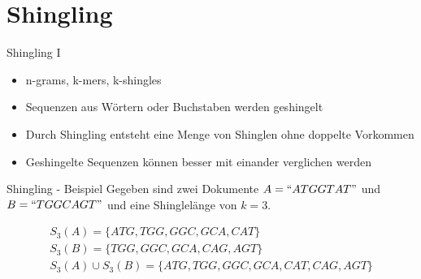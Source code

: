 \section{Shingling}

\begin{frame}{Shingling I}
    \begin{itemize}
        \item n-grams, k-mers, k-shingles
        \item Sequenzen aus Wörtern oder Buchstaben werden geshingelt
        \item Durch Shingling entsteht eine Menge von Shinglen ohne doppelte Vorkommen
        \item Geshingelte Sequenzen können besser mit einander verglichen werden
    \end{itemize}
\end{frame}


\begin{frame}{Shingling - Beispiel}
    Gegeben sind zwei Dokumente $ A = ``ATGGTAT" $ und $ B = ``TGGCAGT" $ und eine Shinglelänge von $ k = 3 $.
    
    \begin{example}
        \begin{equation*}
            \begin{split}
                S_3(A) = \{ATG, TGG, GGC, GCA, CAT\} \\
                S_3(B) = \{TGG, GGC, GCA, CAG, AGT\} \\
                S_3(A) \cup S_3(B) = \{ATG, TGG, GGC, GCA, CAT, CAG, AGT\}
            \end{split}
        \end{equation*}
    \end{example}
\end{frame}